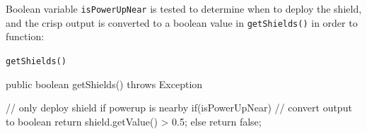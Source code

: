 \noindent
Boolean variable \texttt{isPowerUpNear} is tested to determine when to deploy the shield, and the crisp output is converted to a boolean value in \texttt{getShields()} in order to function:

\begin{listing}[H]
\caption{\texttt{getShields()}}
\begin{javacode}
public boolean getShields() throws Exception {

    // only deploy shield if powerup is nearby
    if(isPowerUpNear) {
        // convert output to boolean
        return shield.getValue() > 0.5;
    } else {
        return false;
    }
}
\end{javacode}
\end{listing}